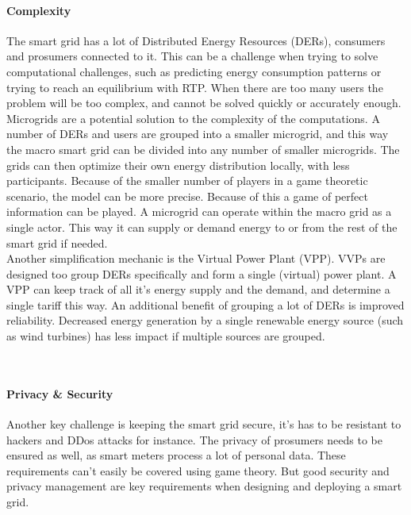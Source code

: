 \paragraph{Complexity} 
The smart grid has a lot of Distributed Energy Resources (DERs), consumers and prosumers connected to it. This can be a challenge when trying to solve computational challenges, such as predicting energy consumption patterns or trying to reach an equilibrium with RTP. When there are too many users the problem will be too complex, and cannot be solved quickly or accurately enough. \\
Microgrids are a potential solution to the complexity of the computations. A number of DERs and users are grouped into a smaller microgrid, and this way the macro smart grid can be divided into any number of smaller microgrids. The grids can then optimize their own energy distribution locally, with less participants. Because of the smaller number of players in a game theoretic scenario, the model can be more precise. Because of this a game of perfect information can be played.
A microgrid can operate within the macro grid as a single actor. This way it can supply or demand energy to or from the rest of the smart grid if needed.\\
Another simplification mechanic is the Virtual Power Plant (VPP). VVPs are designed too group DERs specifically and form a single (virtual) power plant. A VPP can keep track of all it's energy supply and the demand, and determine a single tariff this way. An additional benefit of grouping a lot of DERs is improved reliability. Decreased energy generation by a single renewable energy source (such as wind turbines) has less impact if multiple sources are grouped.


\\



\paragraph{Privacy \& Security}
Another key challenge is keeping the smart grid secure, it's has to be resistant to hackers and DDos attacks for instance. The privacy of prosumers needs to be ensured as well, as smart meters process a lot of personal data. These requirements can't easily be covered using game theory. But good security and privacy management are key requirements when designing and deploying a smart grid. 

